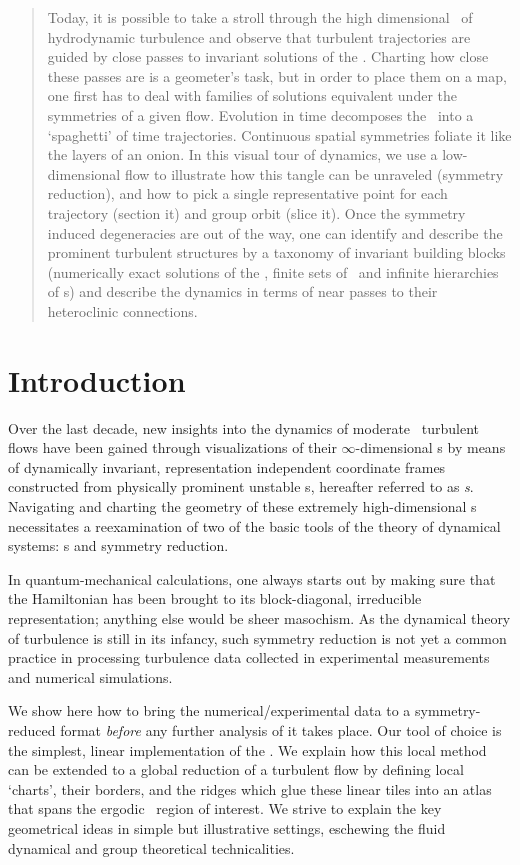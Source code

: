 \documentclass[aip,cha,reprint,
secnumarabic,
nofootinbib, tightenlines,
nobibnotes, showkeys, showpacs,
groupedaddress
]{revtex4-1}
\begin{document}
    \begin{quotation}
Today, it is possible to take a stroll through the high dimensional
\statesp\ of hydrodynamic turbulence and observe that turbulent
trajectories are guided by close passes to invariant solutions of the
\NSe. Charting how close these passes are is a geometer's task, but in
order to place them on a map, one first has to deal with families of
solutions equivalent under the symmetries of a given flow.
Evolution in time decomposes the \statesp\ into a `spaghetti' of time
trajectories. Continuous spatial symmetries foliate it like the layers
of an onion. In this visual tour of dynamics, we use a low-dimensional
flow to illustrate how this tangle can be unraveled (symmetry reduction),
and how to pick a single representative point for each trajectory
(section it) and  group orbit (slice it). Once the symmetry induced
degeneracies are out of the way, one can identify and describe the
prominent turbulent structures by a taxonomy of invariant building
blocks (numerically exact solutions of the \NSe, finite sets of \reqva\
and infinite hierarchies of \rpo s) and describe the dynamics in terms of
near passes to their heteroclinic connections.
    \end{quotation}
\section{Introduction}
\label{s:intro}

Over the last decade, new insights into the dynamics of moderate
\Reynolds\ turbulent flows have been gained through visualizations of
their $\infty$-dimensional \statesp s by means of dynamically invariant,
representation independent coordinate frames constructed from physically
prominent unstable {\cohStr s},\rf{GHCW07} hereafter referred to as {\em
\template s}. Navigating and
charting the geometry of these extremely high-dimensional \statesp s
necessitates a reexamination of two of the basic tools of the theory of
dynamical systems: \PoincSec s and symmetry reduction.

In quantum-mechanical calculations, one always starts out by making sure
that the Hamiltonian has been brought to its block-diagonal, irreducible
representation; anything else would be sheer masochism.
As the dynamical theory of turbulence is still in its infancy, such
symmetry reduction is not yet a common practice in processing  turbulence
data collected in experimental measurements and numerical simulations.

We show here how to bring the numerical/experimental data to a
symmetry-reduced format \emph{before} any further analysis of it takes
place. Our tool of choice is the simplest, linear implementation of the
\mslices.\rf{rowley_reconstruction_2000,BeTh04,SiCvi10,FrCv11}
We explain how this local method
can be extended to a global reduction of a turbulent flow by defining
local `charts', their borders, and the ridges which glue these linear tiles
into an atlas that spans the ergodic \statesp\ region of
interest. We strive to explain the key geometrical ideas in simple but
illustrative settings, eschewing the fluid dynamical and group
theoretical technicalities.
\end{document}
